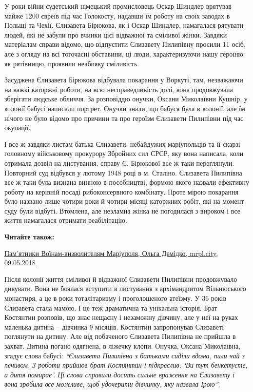 
У роки війни судетський німецький промисловець Оскар Шиндлер врятував майже
1200 євреїв під час Голокосту, надавши їм роботу на своїх заводах в Польщі та
Чехії. Єлизавета Бірюкова, як і Оскар Шиндлер, намагалася рятувати людей, які
не забули про вчинки цієї відважної та сміливої жінки. Завдяки матеріалам
справи відомо, що відпустити Єлизавету Пилипівну просили 11 осіб, але з огляду
на всі тогочасні обставини, ці люди, характеризуючи нашу героїню як рятівницю,
проявили неабияку сміливість.

Засуджена Єлизавета Бірюкова відбувала покарання у Воркуті, там, незважаючи на
важкі каторжні роботи, на всю несправедливість долі, вона продовжувала
зберігати людське обличчя. За розповіддю онучки, Оксани Миколаївни Кушнір, у
колонії бабусі написали портрет. Онучки знали, що бабуся була в колонії, але їм
нічого не було відомо про причини та про героїзм Єлизавети Пилипівни під час
окупації.


І все ж завдяки листам батька Єлизавети, небайдужих маріупольців та її скарзі
головному військовому прокурору Збройних сил СРСР, яку вона написала, коли
отримала дозвіл на листування, справу Є. Бірюкової все ж таки переглянули.
Повторний суд відбувся у лютому 1948 році в м. Сталіно. Єлизавета Пилипівна все
ж таки була визнана винною в пособництві, формою якого назвали ефективну роботу
на керівній посаді рибоконсервного комбінату. Проте мірою покарання було
названо лише чотири роки й чотири місяці каторжних робіт, які на момент суду
були відбуті. Втомлена, але незламна жінка не погодилася з вироком і все життя
намагалася отримати реабілітацію.

\textbf{Читайте також:} 

\href{https://mrpl.city/blogs/view/pamyatniki-voinam-vizvolitelyam-mariupolya}{%
Пам'ятники Воїнам-визволителям Маріуполя, Ольга Демідко, mrpl.city, 09.05.2018}

Після колонії життя сміливої й відважної Єлизавети Пилипівни продовжувало
дивувати. Вона не боялася вступити в листування з архімандритом Вільнюського
монастиря, а це в роки тоталітаризму і проголошеного атеїзму. У 36 років
Єлизавета стала мамою. І це теж драматична та унікальна історія. Брат Костянтин
розповів, що знає нещасну і незаможну дівчину, але у неї на руках маленька
дитина – дівчинка 9 місяців. Костянтин запропонував Єлизаветі поглянути на
дитину. Але від побаченого Єлизавета Пилипівна не прийшла в захват. Дитина
погано одягнена, в ліжечку клопи. Онучка, Оксана Миколаївна, згадує слова
бабусі: \emph{\enquote{Єлизавета Пилипівна з батьками сиділи вдома, пили чай з печивом. З
роботи прийшов брат Костянтин і підкреслив: \enquote{Ви тут бенкетуєте, а дитя
помирає}. Ці слова справили досить сильне враження на Єлизавету і вона зробила
все можливе, щоб удочерити дівчинку, яку назвала Ірою}}.

